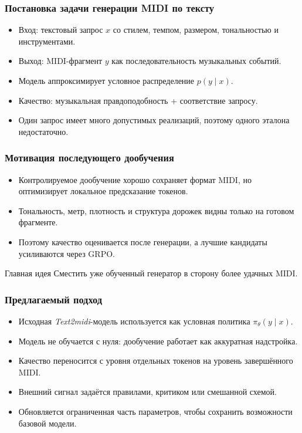 \documentclass[aspectratio=169]{beamer}
\begin{document}
\begin{frame}
\frametitle{Постановка задачи генерации MIDI по тексту}
\begin{itemize}
    \item Вход: текстовый запрос $x$ со стилем, темпом, размером, тональностью и инструментами.
    \item Выход: MIDI-фрагмент $y$ как последовательность музыкальных событий.
    \item Модель аппроксимирует условное распределение $p(y \mid x)$.
    \item Качество: музыкальная правдоподобность + соответствие запросу.
    \item Один запрос имеет много допустимых реализаций, поэтому одного эталона недостаточно.
\end{itemize}
\end{frame}

\begin{frame}
\frametitle{Мотивация последующего дообучения}
\begin{itemize}
    \item Контролируемое дообучение хорошо сохраняет формат MIDI, но оптимизирует локальное предсказание токенов.
    \item Тональность, метр, плотность и структура дорожек видны только на готовом фрагменте.
    \item Поэтому качество оценивается после генерации, а лучшие кандидаты усиливаются через GRPO.
\end{itemize}

\medskip
\begin{alertblock}{Главная идея}
Сместить уже обученный генератор в сторону более удачных MIDI.
\end{alertblock}
\end{frame}

\begin{frame}
\frametitle{Предлагаемый подход}
\begin{itemize}
    \item Исходная \textit{Text2midi}-модель используется как условная политика $\pi_\theta(y \mid x)$.
    \item Модель не обучается с нуля: дообучение работает как аккуратная надстройка.
    \item Качество переносится с уровня отдельных токенов на уровень завершённого MIDI.
    \item Внешний сигнал задаётся правилами, критиком или смешанной схемой.
    \item Обновляется ограниченная часть параметров, чтобы сохранить возможности базовой модели.
\end{itemize}

\medskip
\end{frame}
\end{document}

